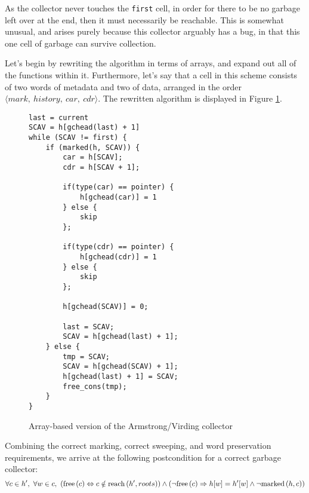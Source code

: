 As the collector never touches the \texttt{first} cell, in order for
there to be no garbage left over at the end, then it must necessarily
be reachable. This is somewhat unusual, and arises purely because this
collector arguably has a bug, in that this one cell of garbage can
survive collection.

Let's begin by rewriting the algorithm in terms of arrays, and expand
out all of the functions within it. Furthermore, let's say that a cell
in this scheme consists of two words of metadata and two of data,
arranged in the order $\langle mark,\ history,\ car,\ cdr
\rangle$. The rewritten algorithm is displayed in Figure
\ref{fig:marksweep-example-partial-arrays}.

\begin{figure}[t]
  \centering
  \begin{lstlisting}
last = current
SCAV = h[gchead(last) + 1]
while (SCAV != first) {
    if (marked(h, SCAV)) {
        car = h[SCAV];
        cdr = h[SCAV + 1];

        if(type(car) == pointer) {
            h[gchead(car)] = 1
        } else {
            skip
        };

        if(type(cdr) == pointer) {
            h[gchead(cdr)] = 1
        } else {
            skip
        };

        h[gchead(SCAV)] = 0;

        last = SCAV;
        SCAV = h[gchead(last) + 1];
    } else {
        tmp = SCAV;
        SCAV = h[gchead(SCAV) + 1];
        h[gchead(last) + 1] = SCAV;
        free_cons(tmp);
    }
}
  \end{lstlisting}
  \caption{Array-based version of the Armstrong/Virding collector}
  \label{fig:marksweep-example-partial-arrays}
\end{figure}

Combining the correct marking, correct sweeping, and word preservation
requirements, we arrive at the following postcondition for a correct
garbage collector: \[\forall c \in h',\ \forall w \in c,\
(\mathrm{free}\left(c\right) \Leftrightarrow c \notin \mathrm{reach}\left(h', roots\right)) \land (\lnot\mathrm{free}\left(c\right) \Rightarrow
h[w] = h'[w] \land \lnot\mathrm{marked}\left(h, c\right))\]


